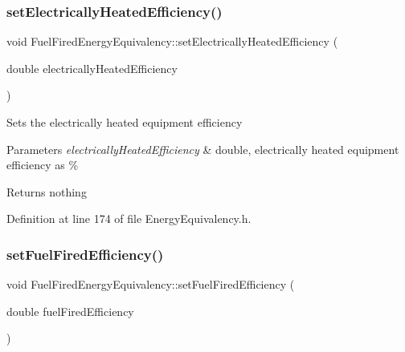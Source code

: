 \subsubsection{\texorpdfstring{set\+Electrically\+Heated\+Efficiency()}{setElectricallyHeatedEfficiency()}\hspace{0.1cm}{\footnotesize\ttfamily [3/3]}}
{\footnotesize\ttfamily void Fuel\+Fired\+Energy\+Equivalency\+::set\+Electrically\+Heated\+Efficiency (\begin{DoxyParamCaption}\item[{double}]{electrically\+Heated\+Efficiency }\end{DoxyParamCaption})\hspace{0.3cm}{\ttfamily [inline]}}

Sets the electrically heated equipment efficiency


\begin{DoxyParams}{Parameters}
{\em electrically\+Heated\+Efficiency} & double, electrically heated equipment efficiency as \%\\
\hline
\end{DoxyParams}
\begin{DoxyReturn}{Returns}
nothing 
\end{DoxyReturn}


Definition at line 174 of file Energy\+Equivalency.\+h.

\mbox{\label{class_fuel_fired_energy_equivalency_a510b4a7c1231faeeebca02fa0b1723ae}} 
\subsubsection{\texorpdfstring{set\+Fuel\+Fired\+Efficiency()}{setFuelFiredEfficiency()}\hspace{0.1cm}{\footnotesize\ttfamily [1/3]}}
{\footnotesize\ttfamily void Fuel\+Fired\+Energy\+Equivalency\+::set\+Fuel\+Fired\+Efficiency (\begin{DoxyParamCaption}\item[{double}]{fuel\+Fired\+Efficiency }\end{DoxyParamCaption})\hspace{0.3cm}{\ttfamily [inline]}}

